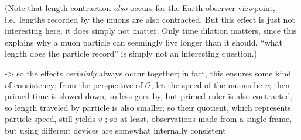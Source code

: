 \documentclass[../relativity_main.tex]{subfiles}
\begin{document}
\begin{ex}
	(Note that length contraction \emph{also} occurs for the Earth observer viewpoint, i.e.~lengths recorded by the muons are also contracted. But this effect is just not interesting here, it does simply not matter. Only time dilation matters, since this explains why a muon particle can seemingly live longer than it should. \enquote{what length does the particle record} is simply not an interesting question.)




	-> so the effects \emph{certainly} always occur together; in fact, this ensures some kind of consistency; from the perspective of $\mathcal{O}$, let the speed of the muons be $v$; then primed time is slowed down, so less goes by, but primed ruler is also contracted, so length traveled by particle is also smaller; so their quotient, which represents particle speed, still yields $v$ ; so at least, observations made from a single frame, but using different devices are somewhat internally consistent




\end{ex}
\end{document}

